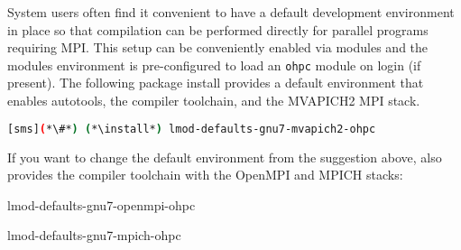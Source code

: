 System users often find it convenient to have a default development environment
in place so that compilation can be performed directly for parallel programs
requiring MPI. This setup can be conveniently enabled via modules and the \OHPC{}
modules environment is pre-configured to load an \texttt{ohpc} module on login
(if present). The following package install provides a default
environment that enables autotools, the \GNU{} compiler toolchain, and the
MVAPICH2 MPI stack.

\begin{lstlisting}[language=bash]
[sms](*\#*) (*\install*) lmod-defaults-gnu7-mvapich2-ohpc
\end{lstlisting}

\begin{center}
\begin{tcolorbox}[]
\small
If you want to change the default environment from the suggestion above, \OHPC{}
also provides the \GNU{} compiler toolchain with the OpenMPI and MPICH stacks:
\begin{itemize*}
\item lmod-defaults-gnu7-openmpi-ohpc
\item lmod-defaults-gnu7-mpich-ohpc
\end{itemize*}
\end{tcolorbox}
\end{center}
